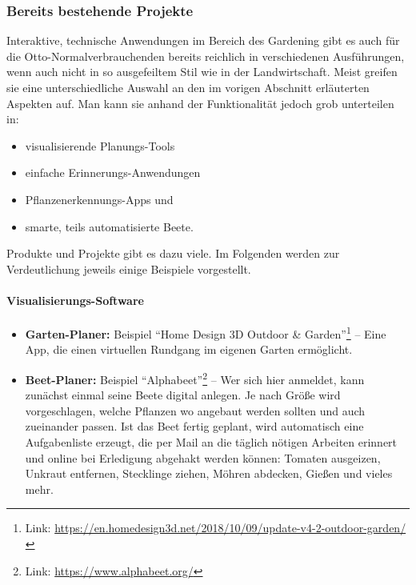 \hypertarget{bereits-bestehende-projekte}{%
\subsubsection{Bereits bestehende
Projekte}\label{bereits-bestehende-projekte}}

Interaktive, technische Anwendungen im Bereich des Gardening gibt es
auch für die Otto-Normalverbrauchenden bereits reichlich in
verschiedenen Ausführungen, wenn auch nicht in so ausgefeiltem Stil wie
in der Landwirtschaft. Meist greifen sie eine unterschiedliche Auswahl
an den im vorigen Abschnitt erläuterten Aspekten auf. Man kann sie
anhand der Funktionalität jedoch grob unterteilen in:

\begin{itemize}
\tightlist
\item
  visualisierende Planungs-Tools
\item
  einfache Erinnerungs-Anwendungen
\item
  Pflanzenerkennungs-Apps und
\item
  smarte, teils automatisierte Beete.
\end{itemize}

Produkte und Projekte gibt es dazu viele. Im Folgenden werden zur
Verdeutlichung jeweils einige Beispiele vorgestellt.

\hypertarget{visualisierungs-software}{%
\paragraph{Visualisierungs-Software}\label{visualisierungs-software}}

\begin{itemize}
\tightlist
\item
  \textbf{Garten-Planer:} Beispiel ``Home Design 3D Outdoor \&
  Garden''\footnote{Link:
    \url{https://en.homedesign3d.net/2018/10/09/update-v4-2-outdoor-garden/}}
  -- Eine App, die einen virtuellen Rundgang im eigenen Garten
  ermöglicht.
\item
  \textbf{Beet-Planer:} Beispiel ``Alphabeet''\footnote{Link:
    \url{https://www.alphabeet.org/}} -- Wer sich hier anmeldet, kann
  zunächst einmal seine Beete digital anlegen. Je nach Größe wird
  vorgeschlagen, welche Pflanzen wo angebaut werden sollten und auch
  zueinander passen. Ist das Beet fertig geplant, wird automatisch eine
  Aufgabenliste erzeugt, die per Mail an die täglich nötigen Arbeiten
  erinnert und online bei Erledigung abgehakt werden können: Tomaten
  ausgeizen, Unkraut entfernen, Stecklinge ziehen, Möhren abdecken,
  Gießen und vieles mehr.
\end{itemize}

